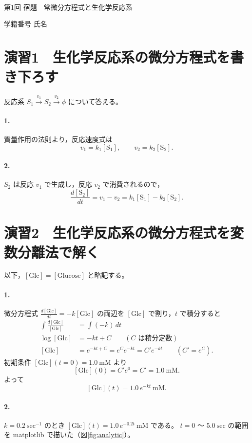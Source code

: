 \documentclass[a4paper,11pt]{ltjsarticle}
\newcommand{\conc}[1]{[\mathrm{#1}]}
\newcommand{\dd}[2]{\frac{d#1}{d#2}}
\begin{document}
\begin{center}
  {\Large 第1回 宿題　常微分方程式と生化学反応系}\par\medskip
  学籍番号 \underline{\hspace{40mm}}\quad 氏名 \underline{\hspace{50mm}}
\end{center}

\section*{演習1　生化学反応系の微分方程式を書き下ろす}
反応系 $S_1 \xrightarrow{v_1} S_2 \xrightarrow{v_2} \phi$ について答える。

\paragraph{1.}
質量作用の法則より，反応速度式は
\[
  v_1 = k_1 \conc{S_1}, \qquad v_2 = k_2 \conc{S_2}.
\]

\paragraph{2.}
$S_2$ は反応 $v_1$ で生成し，反応 $v_2$ で消費されるので，
\[
  \dd{\conc{S_2}}{t} = v_1 - v_2 = k_1 \conc{S_1} - k_2 \conc{S_2}.
\]

\section*{演習2　生化学反応系の微分方程式を変数分離法で解く}
以下，$\conc{Glc} = \conc{Glucose}$ と略記する。

\paragraph{1.}
微分方程式 $\displaystyle \dd{\conc{Glc}}{t} = -k\conc{Glc}$ の両辺を $\conc{Glc}$ で割り，$t$ で積分すると
\begin{align*}
  \int \frac{d\conc{Glc}}{\conc{Glc}} &= \int (-k)\, dt \\
  \log \conc{Glc} &= -kt + C \qquad (C \text{ は積分定数}) \\
  \conc{Glc} &= e^{-kt + C} = e^{C} e^{-kt} = C' e^{-kt} \qquad (C' = e^{C}).
\end{align*}
初期条件 $\conc{Glc}(t=0) = 1.0\ \mathrm{mM}$ より
\[
  \conc{Glc}(0) = C' e^{0} = C' = 1.0\ \mathrm{mM}.
\]
よって
\[
  \conc{Glc}(t) = 1.0\, e^{-kt}\ \mathrm{mM}.
\]

\paragraph{2.}
$k = 0.2\ \mathrm{sec^{-1}}$ のとき $\conc{Glc}(t) = 1.0\, e^{-0.2t}\ \mathrm{mM}$ である。
$t = 0$ 〜 $5.0\ \mathrm{sec}$ の範囲を matplotlib で描いた（図\ref{fig:analytic}）。
\end{document}
